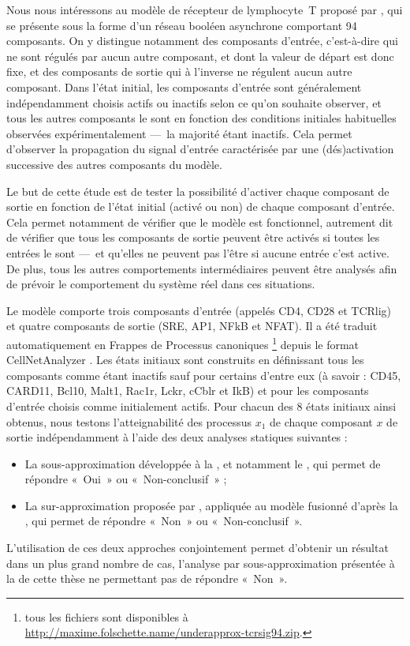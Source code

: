 Nous nous intéressons au modèle de récepteur de lymphocyte~T
proposé par ,
qui se présente sous la forme d'un réseau booléen asynchrone comportant 94 composants.
On y distingue notamment des composants d'entrée, c'est-à-dire qui ne sont régulés
par aucun autre composant, et dont la valeur de départ est donc fixe,
et des composants de sortie qui à l'inverse ne régulent aucun autre composant.
Dans l'état initial, les composants d'entrée sont généralement
indépendamment choisis actifs ou inactifs selon ce qu'on souhaite observer,
et tous les autres composants le sont en fonction des conditions initiales habituelles
observées expérimentalement ---~la majorité étant inactifs.
Cela permet d'observer la propagation du signal d'entrée caractérisée par une (dés)activation
successive des autres composants du modèle.

Le but de cette étude est de tester la possibilité d'activer chaque composant de sortie
en fonction de l'état initial (activé ou non) de chaque composant d'entrée.
Cela permet notamment de vérifier que le modèle est fonctionnel,
autrement dit de vérifier que
tous les composants de sortie peuvent être activés si toutes les entrées le sont
---~et qu'elles ne peuvent pas l'être si aucune entrée c'est active.
De plus, tous les autres comportements intermédiaires peuvent être analysés
afin de prévoir le comportement du système réel dans ces situations.

Le modèle comporte trois composants d'entrée (appelés CD4, CD28 et TCRlig)
et quatre composants de sortie (SRE, AP1, NFkB et NFAT).
Il a été traduit automatiquement en Frappes de Processus canoniques%
\footnote{tous les fichiers sont disponibles à
\url{http://maxime.folschette.name/underapprox-tcrsig94.zip}.}
depuis le format CellNetAnalyzer \cite{klamt2007structural}.
Les états initiaux sont construits en définissant tous les composants
comme étant inactifs sauf pour certains d'entre eux
(à savoir : CD45, CARD11, Bcl10, Malt1, Rac1r, Lckr, cCblr et IkB)
et pour les composants d'entrée choisis comme initialement actifs.
Pour chacun des 8 états initiaux ainsi obtenus,
nous testons l'atteignabilité des processus $x_1$ de chaque composant $x$ de sortie
indépendamment à l'aide des deux analyses statiques suivantes :
\begin{itemize}
  \item La sous-approximation développée à la ,
    et notamment le ,
    qui permet de répondre «~Oui~» ou «~Non-conclusif~» ;
  \item La sur-approximation proposée par ,
    appliquée au modèle fusionné d'après la ,
    qui permet de répondre «~Non~» ou «~Non-conclusif~».
\end{itemize}
L'utilisation de ces deux approches conjointement permet d'obtenir un résultat dans un
plus grand nombre de cas,
l'analyse par sous-approximation présentée à la  de cette thèse
ne permettant pas de répondre «~Non~».


